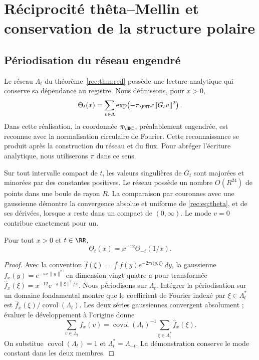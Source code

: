 \section{Réciprocité thêta--Mellin et conservation de la structure polaire}
\label{rec:espectral}

\subsection{Périodisation du réseau engendré}

Le réseau \(\Lambda_t\) du théorème~\ref{rec:thm:red} possède une lecture analytique qui conserve sa dépendance au registre. Nous définissons, pour \(x>0\),
\begin{equation}
 \Theta_t(x)=\sum_{v\in\Lambda}
       \exp\!\left(-\pi_{\HMT}x\|G_tv\|^2\right).
 \label{rec:eq:theta}
\end{equation}
Dans cette réalisation, la coordonnée \(\pi_{\HMT}\), préalablement engendrée, est reconnue avec la normalisation circulaire de Fourier. Cette reconnaissance se produit après la construction du réseau et du flux. Pour abréger l’écriture analytique, nous utiliserons \(\pi\) dans ce sens.

Sur tout intervalle compact de \(t\), les valeurs singulières de \(G_t\) sont majorées et minorées par des constantes positives. Le réseau possède un nombre \(O(R^{24})\) de points dans une boule de rayon \(R\). La comparaison par couronnes avec une gaussienne démontre la convergence absolue et uniforme de \eqref{rec:eq:theta}, et de ses dérivées, lorsque \(x\) reste dans un compact de \((0,\infty)\). Le mode \(v=0\) contribue exactement pour un.


\begin{theorem}
\label{rec:thm:theta}
Pour tout \(x>0\) et \(t\in\RR\),
\begin{equation}
 \Theta_t(x)=x^{-12}\Theta_{-t}(1/x).
 \label{rec:eq:theta-reciproca}
\end{equation}
\end{theorem}
\begin{proof}
Avec la convention \(\widehat f(\xi)=\int f(y)e^{-2\pi i\langle y,\xi\rangle}\,dy\), la gaussienne \(f_x(y)=e^{-\pi x\|y\|^2}\) en dimension vingt-quatre a pour transformée \(\widehat f_x(\xi)=x^{-12}e^{-\pi\|\xi\|^2/x}\). Nous périodisons sur \(\Lambda_t\). Intégrer la périodisation sur un domaine fondamental montre que le coefficient de Fourier indexé par \(\xi\in\Lambda_t^*\) est \(\widehat f_x(\xi)/\operatorname{covol}(\Lambda_t)\). Les deux séries gaussiennes convergent absolument ; évaluer le développement à l'origine donne
\[
 \sum_{v\in\Lambda_t}f_x(v)
 =\operatorname{covol}(\Lambda_t)^{-1}
   \sum_{\xi\in\Lambda_t^*}\widehat f_x(\xi).
\]
On substitue \(\operatorname{covol}(\Lambda_t)=1\) et \(\Lambda_t^*=\Lambda_{-t}\). La démonstration conserve le mode constant dans les deux membres.
\end{proof}

